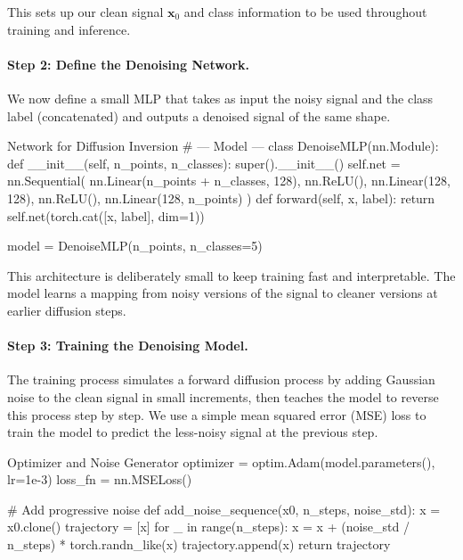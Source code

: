 This sets up our clean signal \( \mathbf{x}_0 \) and class information to be used throughout training and inference.

%
\paragraph{Step 2: Define the Denoising Network.} We now define a small MLP that takes as input the noisy signal and the class label (concatenated) and outputs a denoised signal of the same shape.

\begin{codeonly}{Network for Diffusion Inversion}
# --- Model ---
class DenoiseMLP(nn.Module):
    def __init__(self, n_points, n_classes):
        super().__init__()
        self.net = nn.Sequential(
            nn.Linear(n_points + n_classes, 128),
            nn.ReLU(),
            nn.Linear(128, 128),
            nn.ReLU(),
            nn.Linear(128, n_points)
        )
    def forward(self, x, label):
        return self.net(torch.cat([x, label], dim=1))

model = DenoiseMLP(n_points, n_classes=5)
\end{codeonly}

This architecture is deliberately small to keep training fast and interpretable. The model learns a mapping from noisy versions of the signal to cleaner versions at earlier diffusion steps.

%
\paragraph{Step 3: Training the Denoising Model.} The training process simulates a forward diffusion process by adding Gaussian noise to the clean signal in small increments, then teaches the model to reverse this process step by step. We use a simple mean squared error (MSE) loss to train the model to predict the less-noisy signal at the previous step.

\begin{codeonly}{Optimizer and Noise Generator}
optimizer = optim.Adam(model.parameters(), lr=1e-3)
loss_fn = nn.MSELoss()

# Add progressive noise
def add_noise_sequence(x0, n_steps, noise_std):
    x = x0.clone()
    trajectory = [x]
    for _ in range(n_steps):
        x = x + (noise_std / n_steps) * torch.randn_like(x)
        trajectory.append(x)
    return trajectory
\end{codeonly}

